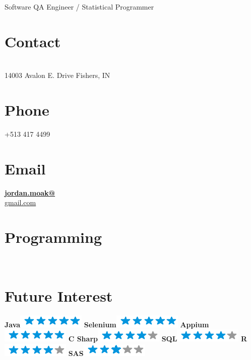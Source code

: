 \documentclass[]{moak-resume}
\begin{document}
      {Software QA Engineer / Statistical Programmer}

\begin{aside}
  \section{Contact}
    \faGithub\\14003 Avalon E. Drive
    Fishers, IN
    ~
  \section{Phone}
    +513 417 4499
    ~
  \section{Email}
    \href{mailto:jordan.moak@gmail.com}{\textbf{jordan.moak@}\\gmail.com}
    ~
  \section{Programming}
	\programmingPie{}
    ~
  \section{Future Interest}
    \textbf{Java}\includegraphics[scale=0.40]{img/5stars.png}
    \textbf{Selenium}\includegraphics[scale=0.40]{img/5stars.png}
    \textbf{Appium}\includegraphics[scale=0.40]{img/5stars.png}
    \textbf{C Sharp}\includegraphics[scale=0.40]{img/4stars.png}
    \textbf{SQL}\includegraphics[scale=0.40]{img/4stars.png}
    \textbf{R}\includegraphics[scale=0.40]{img/4stars.png}
    \textbf{SAS}\includegraphics[scale=0.40]{img/3stars.png}
    ~

\end{aside}
\end{document}
